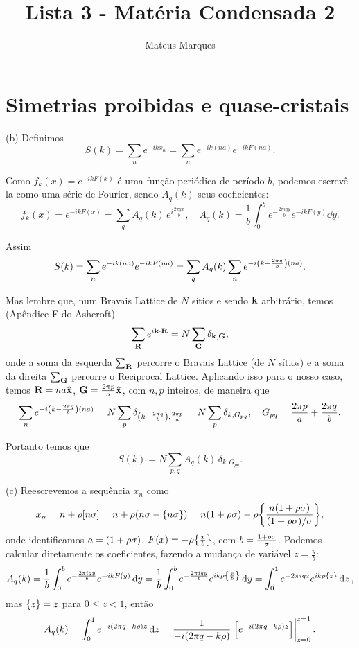 \documentclass[a4paper,10pt]{article}
\title{\Huge{\textbf{Lista 3 - Matéria Condensada 2}}}
\author{Mateus Marques}
\begin{document}
\maketitle

\section{Simetrias proibidas e quase-cristais}

(b) Definimos
$$
\boxed{ S(k) = \sum_{n} e^{-i k x_n} } = \sum_{n} e^{-i k (n a)} e^{-i k F(na)}.
$$

Como $f_k(x) = e^{-i k F(x)}$ é uma função periódica de período $b$, podemos escrevê-la como uma série de Fourier, sendo $A_q(k)$ seus coeficientes:
$$
f_k(x) = e^{-i k F(x)} = \sum_{q} A_q(k) \, e^{i \frac{2\pi q x}{b}}, \quad
\boxed{ A_q(k) = \frac{1}{b} \int_0^b e^{-\frac{2\pi i q y}{b}} e^{-i k F(y)} \dd{y}. }
$$

Assim
$$
S(k) = \sum_{n} e^{-i k (n a)} e^{-i k F(na)} = \sum_{q} A_q(k) \sum_{n} e^{-i\qty(k - \frac{2\pi q}{b})(na)}.
$$

Mas lembre que, num Bravais Lattice de $N$ sítios e sendo $\vb{k}$ arbitrário, temos (Apêndice F do Ashcroft)
$$
\sum_{\vb{R}} e^{i \k \vdot \vb{R}} = N \sum_{\vb{G}} \delta_{\k,\vb{G}},
$$
onde a soma da esquerda $\sum_{\vb{R}}$ percorre o Bravais Lattice (de $N$ sítios) e a soma da direita $\sum_{\vb{G}}$ percorre o Reciprocal Lattice. Aplicando isso para o nosso caso, temos $\vb{R} = na \vu{x}$, $\vb{G} = \frac{2\pi p}{a} \vu{x}$, com $n, p$ inteiros, de maneira que
$$
\sum_{n} e^{-i \qty(k - \frac{2 \pi q}{b}) (na)} = N \sum_{p} \delta_{\qty(k - \frac{2 \pi q}{b}), \frac{2\pi p}{a}} =
N \sum_{p} \delta_{k, G_{pq}}, \quad G_{pq} = \frac{2\pi p}{a} + \frac{2\pi q}{b}.
$$

Portanto temos que
$$
\boxed{ S(k) = N \sum_{p, q} A_q(k) \, \delta_{k, G_{pq}}. }
$$

(c) Reescrevemos a sequência $x_n$ como
$$
x_n = n + \rho [n \sigma] = n + \rho ( n \sigma - \{n\sigma\}) = n (1 + \rho \sigma) - \rho \qty{\frac{n (1 + \rho \sigma)}{(1+\rho\sigma)/\sigma}},
$$
onde identificamos $a = (1 + \rho \sigma)$, $F(x) = -\rho \qty{\frac{x}{b}}$, com $b = \frac{1+\rho\sigma}{\sigma}$. Podemos calcular diretamente os coeficientes, fazendo a mudança de variável $z = \frac{y}{b}$:
$$
A_q(k) = \frac{1}{b} \int_0^b e^{-\frac{2\pi i q y}{b}} e^{-i k F(y)} \dd{y} =
\frac{1}{b} \int_0^b e^{-\frac{2\pi i q y}{b}} e^{i k \rho \qty{\frac{x}{b}}} \dd{y} =
\int_0^1 e^{-2\pi i q z} e^{i k \rho \qty{z}} \dd{z},
$$
mas $\qty{z} = z$ para $0 \leq z < 1$, então
$$
A_q(k) = \int_0^1 e^{-i(2\pi q - k \rho) z} \dd{z} =
\frac{1}{-i(2\pi q - k\rho)} \eval{\qty[e^{-i(2\pi q - k \rho) z}]}_{z=0}^{z=1}.
$$
\end{document}
